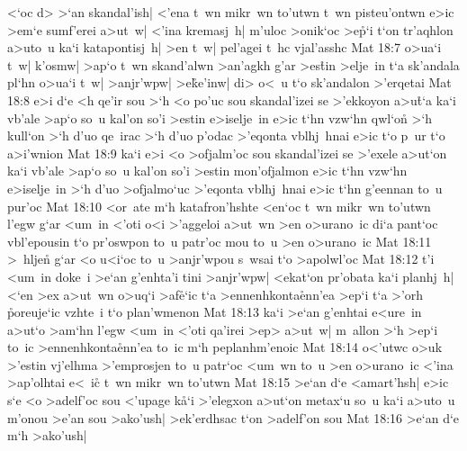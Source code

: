 <`oc
d>
>`an
skandal'ish|
<'ena
t~wn
mikr~wn
to'utwn
t~wn
pisteu'ontwn
e>ic
>em`e
sumf'erei
a>ut~w|
<'ina
kremasj~h|
m'uloc
>onik`oc
>e\r{p}`i
t`on
tr'aqhlon
a>uto~u
ka`i
katapontisj~h|
>en
t~w|
pel'agei
t~hc
vjal'asshc\bibvsend
\vs Mat 18:7
o>ua`i
t~w|
k'osmw|
>ap`o
t~wn
skand'alwn
>an'agkh
g'ar
>es\r{t}in
>elje~in
t`a
sk'andala
pl`hn
o>ua`i
t~w|
>anjr'wpw|
>e\r{k}e'inw|
di>
o<~u
t`o
sk'andalon
>'erqetai\bibvsend
\vs Mat 18:8
e>i
d`e
<h
qe'ir
sou
>`h
<o
po'uc
sou
skandal'izei
se
>'ekkoyon
a>u\r{t}`a
ka`i
vb'ale
>ap`o
so~u
kal'on
so'i
>estin
e>iselje~in
e>ic
t`hn
vzw`hn
qwl`on\r{}
>`h
kull`on
>`h
d'uo
qe~irac
>`h
d'uo
p'odac
>'eqonta
vblhj~hnai
e>ic
t`o
p~ur
t`o
a>i'wnion\bibvsend
\vs Mat 18:9
ka`i
e>i
<o
>ofjalm'oc
sou
skandal'izei
se
>'exele
a>ut`on
ka`i
vb'ale
>ap`o
so~u
kal'on
so'i
>estin
mon'ofjalmon
e>ic
t`hn
vzw`hn
e>iselje~in
>`h
d'uo
>ofjalmo`uc
>'eqonta
vblhj~hnai
e>ic
t`hn
g'eennan
to~u
pur'oc\bibvsend
\vs Mat 18:10
<or~ate
m`h
katafron'hshte
<en`oc
t~wn
mikr~wn
to'utwn
l'egw
g`ar
<um~in
<'oti
o<i
>'aggeloi
a>ut~wn
>en
o>urano~ic
di`a
pant`oc
vbl'epousin
t`o
pr'oswpon
to~u
patr'oc
mou
to~u
>en
o>urano~ic\bibvsend
\vs Mat 18:11
>~hljen\r{}
g`ar
<o
u<i`oc
to~u
>anjr'wpou
s~wsai
t`o
>apolwl'oc\bibvsend
\vs Mat 18:12
t'i
<um~in
doke~i
>e`an
g'enhta'i
tini
>anjr'wpw|
<ekat`on
pr'obata
ka`i
planhj~h|
<`en
>ex
a>ut~wn
o>uq`i
>af\r{e}`ic
t`a
>ennenhkonta\r{e}nn'ea
>ep`i
t`a
>'orh
\r{p}oreuje`ic
vzhte~i
t`o
plan'wmenon\bibvsend
\vs Mat 18:13
ka`i
>e`an
g'enhtai
e<ure~in
a>ut`o
>am`hn
l'egw
<um~in
<'oti
qa'irei
>ep>
a>ut~w|
m~allon
>`h
>ep`i
to~ic
>ennenhkonta\r{e}nn'ea
to~ic
m`h
peplanhm'enoic\bibvsend
\vs Mat 18:14
o<'utwc
o>uk
>'estin
vj'elhma
>'emprosjen
to~u
patr`oc
<um~wn
to~u
>en
o>urano~ic
<'ina
>ap'olhtai
e<~i\r{c}
t~wn
mikr~wn
to'utwn\bibvsend
\vs Mat 18:15
>e`an
d`e
<amart'hsh|
e>ic
s`e
<o
>adelf'oc
sou
<'upage
k\r{a}`i
>'elegxon
a>ut`on
metax`u
so~u
ka`i
a>uto~u
m'onou
>e'an
sou
>ako'ush|
>ek'erdhsac
t`on
>adelf'on
sou\bibvsend
\vs Mat 18:16
>e`an
d`e
m`h
>ako'ush|
